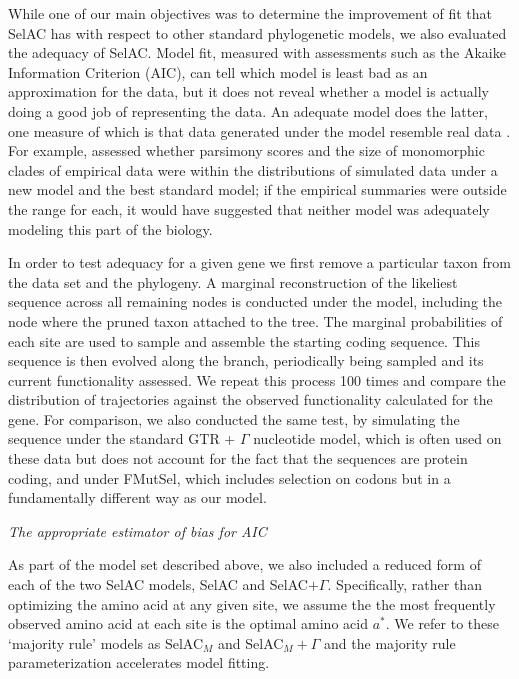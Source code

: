 \documentclass[12pt,letterpaper,fleqn]{article}
\renewcommand{\subsection}[1]{%
\bigskip
\begin{center}
\begin{large}
\normalfont\itshape #1
\end{large}
\end{center}}
\newcommand{\selac}{SelAC\xspace}
\newcommand{\selacplusgamma}{SelAC$+\Gamma$\xspace}
\newcommand{\selacmaj}{SelAC$_{M}$\xspace}
\newcommand{\selacmajplusgamma}{SelAC$_{M}+\Gamma$\xspace}
\newcommand{\aopt}{\ensuremath{a^*}\xspace}
\begin{document}
While one of our main objectives was to determine the improvement of fit that \selac has with respect to other standard phylogenetic models, we also evaluated the adequacy of \selac.
Model fit, measured with assessments such as the Akaike Information Criterion (AIC), can tell which model is least bad as an approximation for the data, but it does not reveal whether a model is actually doing a good job of representing the data. %
An adequate model does the latter, one measure of which is that data generated under the model resemble real data \citep{goldman1993statistical}.
For example, \citet{BeaulieuEtAl2013} assessed whether parsimony scores and the size of monomorphic clades of empirical data were within the distributions of simulated data under a new model and the best standard model; if the empirical summaries were outside the range for each, it would have suggested that neither model was adequately modeling this part of the biology.

In order to test adequacy for a given gene we first remove a particular taxon from the data set and the phylogeny.
A marginal reconstruction of the likeliest sequence across all remaining nodes is conducted under the model, including the node where the pruned taxon attached to the tree.
The marginal probabilities of each site are used to sample and assemble the starting coding sequence.
This sequence is then evolved along the branch, periodically being sampled and its current functionality assessed.
We repeat this process 100 times and compare the distribution of trajectories against the observed functionality calculated for the gene.
For comparison, we also conducted the same test, by simulating the sequence under the standard GTR + $\Gamma$ nucleotide model, which is often used on these data but does not account for the fact that the sequences are protein coding, and under FMutSel, which includes selection on codons but in a fundamentally different way as our model.

\subsection{The appropriate estimator of bias for AIC}
As part of the model set described above, we also included a reduced form of each of the two \selac models, \selac and \selacplusgamma.
Specifically, rather than optimizing the amino acid at any given site, we assume the  the most frequently observed amino acid at each site is the optimal amino acid \aopt.
We refer to these `majority rule' models as \selacmaj and \selacmajplusgamma and the majority rule parameterization accelerates model fitting.
\end{document}
